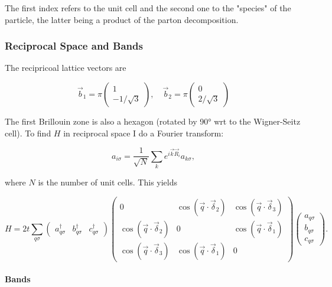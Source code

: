 \documentclass[../../../main.tex]{subfiles}
\begin{document}
The first index refers to the unit cell and the second one to the "species" of the particle, the latter being a product of the parton decomposition.

\subsubsection{Reciprocal Space and Bands}

The recipricoal lattice vectors are 

\begin{equation}
	\vec{b}_1 = \pi
	\begin{pmatrix}
		1 \\
		-1/\sqrt{3}
	\end{pmatrix}, \quad
	\vec{b}_2 = \pi 
	\begin{pmatrix}
		0 \\
		2/\sqrt{3}
	\end{pmatrix}
\end{equation}

The first Brillouin zone is also a hexagon (rotated by 90° wrt to the Wigner-Seitz cell). To find $H$ in reciprocal space I do a Fourier transform: 

\begin{equation}
	a_{i\sigma} = \frac{1}{\sqrt{N}} \sum_{k} e^{i\vec{k}\vec{R}_i} a_{k\sigma},
\end{equation}

where $N$ is the number of unit cells. This yields

\begin{equation}
	H = 2t \sum_{q\sigma}
	\begin{pmatrix}
		a_{q\sigma}^\dagger & b_{q\sigma}^\dagger & c_{q\sigma}^\dagger 
	\end{pmatrix}
	\begin{pmatrix}
		0 & \cos(\vec{q}\cdot\vec{\delta}_2) & \cos(\vec{q}\cdot\vec{\delta}_3) \\
		\cos(\vec{q}\cdot\vec{\delta}_2) & 0 & \cos(\vec{q}\cdot\vec{\delta}_1) \\
		\cos(\vec{q}\cdot\vec{\delta}_3) & \cos(\vec{q}\cdot\vec{\delta}_1) & 0
	\end{pmatrix}
	\begin{pmatrix}
		a_{q\sigma} \\
		b_{q\sigma} \\
		c_{q\sigma}
	\end{pmatrix}.
\end{equation}

\paragraph{Bands} \hfill \\
\end{document}
